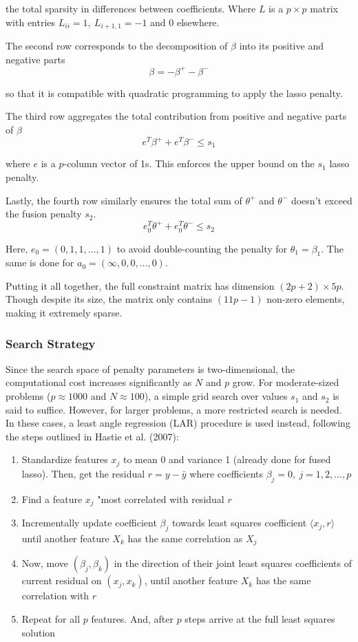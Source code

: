 \documentclass[12pt]{article}
\begin{document}
\noindent the total sparsity in differences between coefficients. Where $L$ is a $p \times p$ matrix with entries $L_{ii} = 1, ~L_{i + 1, 1} = -1$ and 0 elsewhere.

The second row corresponds to the decomposition of $\beta$ into its positive and negative parts
\[\beta = -\beta^+ - \beta^-\]

\noindent so that it is compatible with quadratic programming to apply the lasso penalty. 

The third row aggregates the total contribution from positive and negative parts of $\beta$
\[e^T\beta^+ + e^T\beta^- \le s_1\]

\noindent where $e$ is a $p$-column vector of 1s. This enforces the upper bound on the $s_1$ lasso penalty.

Lastly, the fourth row similarly ensures the total sum of $\theta^+$ and $\theta^-$ doesn't exceed the fusion penalty $s_2$.
\[e_0^T\theta^+ + e_0^T\theta^- \le s_2\]

\noindent Here, $e_0 = (0, 1, 1, \dots, 1)$ to avoid double-counting the penalty for $\theta_1 = \beta_1$. The same is done for $a_0 = (\infty, 0, 0, \dots, 0)$.

Putting it all together, the full constraint matrix has dimension $(2p + 2) \times 5p$. Though despite its size, the matrix only contains $(11p - 1)$ non-zero elements, making it extremely sparse.

\subsubsection{Search Strategy}
Since the search space of penalty parameters is two-dimensional, the computational cost increases significantly as $N$ and $p$ grow. For moderate-sized problems ($p \approx 1000$ and $N \approx 100$), a simple grid search over values $s_1$ and $s_2$ is said to suffice. However, for larger problems, a more restricted search is needed. In these cases, a least angle regression (LAR) procedure is used instead, following the steps outlined in Hastie et al. (2007):

\begin{enumerate}
    \item Standardize features $x_j$ to mean 0 and variance 1 (already done for fused lasso). Then, get the residual $r = y - \bar{y}$ where coefficients $\beta_j = 0, ~j = 1, 2, \dots, p$
    \item Find a feature $x_j$ "most correlated with residual $r$
    \item Incrementally update coefficient $\beta_j$ towards least squares coefficient $\langle x_j, r \rangle$ until another feature $X_k$ has the same correlation as $X_j$
    \item Now, move $(\beta_j, \beta_k)$ in the direction of their joint least squares coefficients of current residual on $(x_j, x_k)$, until another feature $X_k$ has the same correlation with $r$
    \item Repeat for all $p$ features. And, after $p$ steps arrive at the full least squares solution
\end{enumerate}
\end{document}
